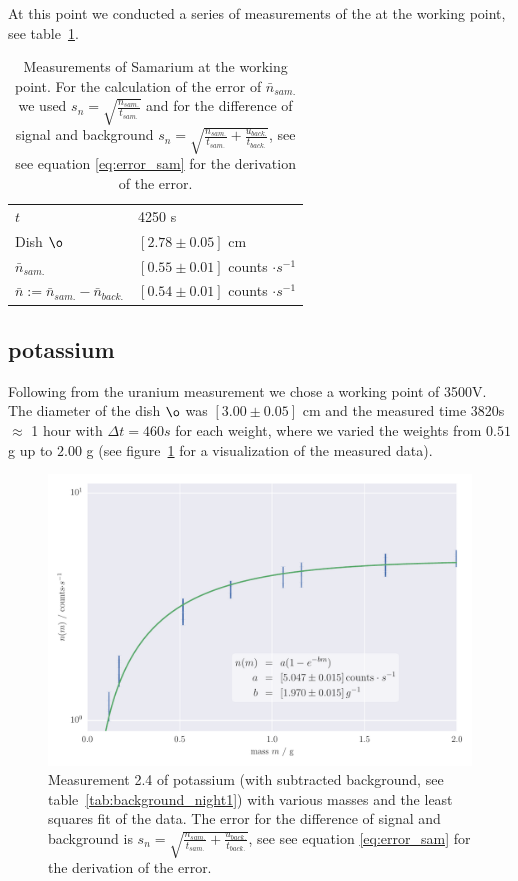 At this point we conducted a series of measurements of the at the working point, see table~\ref{tab:mes1}.
\begin{table}
    \caption{Measurements of Samarium at the working point. For the calculation
    of the error of $\bar{n}_{sam.}$ we used $s_n = \sqrt{\frac{n_{sam.}}{t_{sam.}}}$ and for the difference
    of signal and background $s_n = \sqrt{\frac{n_{sam.}}{t_{sam.}}+\frac{u_{back.}}{t_{back.}} }$, see see equation \eqref{eq:error_sam} for
    the derivation of the error.}
    \begin{tabular}{l l}
        \rowcolor{tabcolor}$t$ & 4250 s \\ 
        Dish $\o$ & $\left [ 2.78 \pm 0.05 \right ]$ cm \\ 
        \rowcolor{tabcolor}$\bar{n}_{sam.}$ & $\left [ 0.55 \pm 0.01 \right ] $ counts $\cdot s^{-1}$ \\ 
        $\bar{n} := \bar{n}_{sam.} - \bar{n}_{back.}$ & $\left [ 0.54 \pm 0.01 \right ] $ counts $\cdot s^{-1}$ \\ 
    \end{tabular}
    \label{tab:mes1}
\end{table}
\subsection{potassium}
Following from the uranium measurement we chose a working point of 3500V. The diameter 
of the dish $\o$ was $\left [ 3.00 \pm 0.05 \right ]$ cm and the measured time 3820s $\approx$ 1 hour with
$\Delta t = 460s$ for each weight, where we varied the weights from $0.51$ g up to $2.00$ g (see figure~\ref{fig:2_4_potassium} 
for a visualization of the measured data).
\label{subsec:potassium}
\begin{figure}[H]
    \centering
    \includegraphics[width=\linewidth]{analysis/figures/measurement_2_4}
    \caption{Measurement 2.4 of potassium (with subtracted background, see table~\ref{tab:background_night1}) with various masses
    and the least squares fit of the data. The error for the difference
    of signal and background is $s_n = \sqrt{\frac{n_{sam.}}{t_{sam.}}+\frac{u_{back.}}{t_{back.}} }$, see see equation \eqref{eq:error_sam} for
    the derivation of the error.}
    \label{fig:2_4_potassium}
\end{figure}
